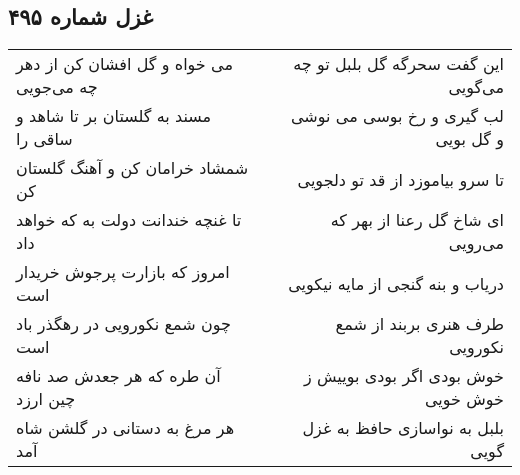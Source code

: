 \begin{center}
\section*{غزل شماره ۴۹۵}
\label{sec:sh495}
\begin{longtable}{l p{0.5cm} r}
می خواه و گل افشان کن از دهر چه می‌جویی
&&
این گفت سحرگه گل بلبل تو چه می‌گویی
\\
مسند به گلستان بر تا شاهد و ساقی را
&&
لب گیری و رخ بوسی می نوشی و گل بویی
\\
شمشاد خرامان کن و آهنگ گلستان کن
&&
تا سرو بیاموزد از قد تو دلجویی
\\
تا غنچه خندانت دولت به که خواهد داد
&&
ای شاخ گل رعنا از بهر که می‌رویی
\\
امروز که بازارت پرجوش خریدار است
&&
دریاب و بنه گنجی از مایه نیکویی
\\
چون شمع نکورویی در رهگذر باد است
&&
طرف هنری بربند از شمع نکورویی
\\
آن طره که هر جعدش صد نافه چین ارزد
&&
خوش بودی اگر بودی بوییش ز خوش خویی
\\
هر مرغ به دستانی در گلشن شاه آمد
&&
بلبل به نواسازی حافظ به غزل گویی
\\
\end{longtable}
\end{center}
